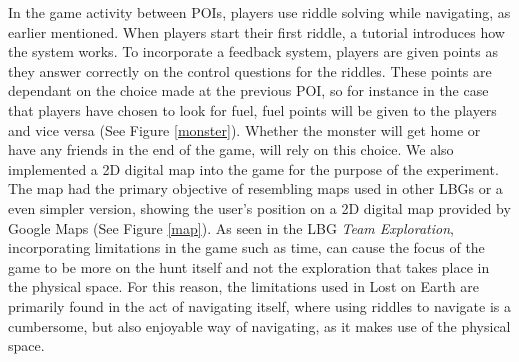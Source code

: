 In the game activity between POIs, players use riddle solving while navigating, as earlier mentioned. When players start their first riddle, a tutorial introduces how the system works. To incorporate a feedback system, players are given points as they answer correctly on the control questions for the riddles. These points are dependant on the choice made at the previous POI, so for instance in the case that players have chosen to look for fuel, fuel points will be given to the players and vice versa (See Figure \ref{monster}). Whether the monster will get home or have any friends in the end of the game, will rely on this choice. We also implemented a 2D digital map into the game for the purpose of the experiment. The map had the primary objective of resembling maps used in other LBGs or a even simpler version, showing the user's position on a 2D digital map provided by Google Maps (See Figure \ref{map}). As seen in the LBG \textit{Team Exploration}, incorporating limitations in the game such as time, can cause the focus of the game to be more on the hunt itself and not the exploration that takes place in the physical space. For this reason, the limitations used in Lost on Earth are primarily found in the act of navigating itself, where using riddles to navigate is a cumbersome, but also enjoyable way of navigating, as it makes use of the physical space. 